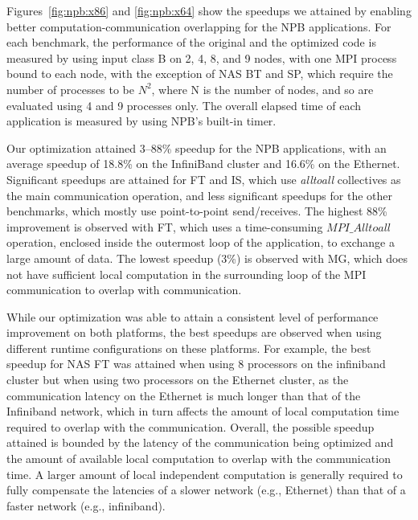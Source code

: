 Figures~\ref{fig:npb:x86} and \ref{fig:npb:x64} show the speedups we
attained by enabling better computation-communication overlapping for
the NPB applications.  For each benchmark, the
performance of the original and the optimized code is
measured by using input class B on 2, 4, 8, and 9 nodes, with one MPI
process bound to each node, with the exception of NAS BT and SP, which
require the number of processes to be $N^2$, where N is the number of nodes, and so are
evaluated using 4 and 9 processes only.  The overall elapsed time of
each application is measured by using NPB's built-in timer. 

Our optimization attained 3--88\% speedup for the NPB applications, with an average speedup of 18.8\% on the InfiniBand cluster and 16.6\% on the Ethernet.  
Significant speedups are attained for FT and IS, which 
use {\em alltoall} collectives as the main communication operation, 
and less significant speedups for the other benchmarks, which mostly use point-to-point send/receives.  
The highest 88\% improvement is observed with FT, which uses a time-consuming $MPI\_Alltoall$ operation,
enclosed inside the outermost loop of the application, to exchange a
large amount of data.  The lowest speedup (3\%) is observed with
MG, which does not have sufficient local computation in the
surrounding loop of the MPI communication to overlap with
communication. 


While our optimization was able to attain a consistent level of performance improvement on both platforms, 
the best speedups are observed when using different runtime configurations on these platforms. 
For example, the best speedup for NAS FT was attained when using 8 processors on the infiniband cluster
but when using two processors on the Ethernet cluster, as the communication latency on the Ethernet is much longer than 
that of the Infiniband network, which in turn affects the amount of local computation time required to overlap with the communication.
Overall,  the possible speedup attained is bounded by the latency of the communication being optimized and the amount of available
local computation to overlap with the communication time. A larger amount of local independent computation is generally required to fully compensate the latencies of a slower network (e.g., Ethernet) than that of a faster network (e.g., infiniband).
